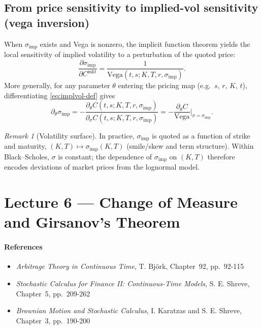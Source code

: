\documentclass[11pt]{article}
\newcommand{\1}{\mathbf{1}}
\theoremstyle{plain}
\theoremstyle{definition}
\theoremstyle{remark}
\newtheorem{remark}[theorem]{Remark}
\begin{document}
\subsection{From price sensitivity to implied-vol sensitivity (vega inversion)}
When $\sigma_{\mathrm{imp}}$ exists and Vega is nonzero, the implicit function theorem yields the local sensitivity
of implied volatility to a perturbation of the quoted price:
\begin{equation}\label{eq:impvol-sensitivity}
\frac{\partial \sigma_{\mathrm{imp}}}{\partial C^{\mathrm{mkt}}}
=
\frac{1}{\text{Vega}(t,s;K,T,r,\sigma_{\mathrm{imp}})}.
\end{equation}
More generally, for any parameter $\theta$ entering the pricing map (e.g.\ $s$, $r$, $K$, $t$),
differentiating \eqref{eq:implvol-def} gives
\begin{equation}\label{eq:impvol-chainrule}
\partial_\theta \sigma_{\mathrm{imp}}
=
-\frac{\partial_\theta C(t,s;K,T,r,\sigma_{\mathrm{imp}})}{\partial_\sigma C(t,s;K,T,r,\sigma_{\mathrm{imp}})}
=
-\frac{\partial_\theta C}{\text{Vega}}\Big|_{\sigma=\sigma_{\mathrm{imp}}}.
\end{equation}

\begin{remark}[Volatility surface]
In practice, $\sigma_{\mathrm{imp}}$ is quoted as a function of strike and maturity,
$(K,T)\mapsto \sigma_{\mathrm{imp}}(K,T)$ (smile/skew and term structure).
Within Black--Scholes, $\sigma$ is constant; the dependence of $\sigma_{\mathrm{imp}}$ on $(K,T)$
therefore encodes deviations of market prices from the lognormal model.
\end{remark}

\section{Lecture 6 --- Change of Measure and Girsanov's Theorem}


\paragraph{References}

\begin{itemize}[leftmargin=1.4em]

\item \textit{Arbitrage Theory in Continuous Time},  
T. Björk, Chapter~92, pp.~92-115

\item \textit{Stochastic Calculus for Finance II: Continuous-Time Models},  
S. E. Shreve, Chapter~5, pp.~209-262

\item \textit{Brownian Motion and Stochastic Calculus}, I. Karatzas and S. E. Shreve, Chapter~3, pp.~190-200

\end{itemize}
\end{document}
